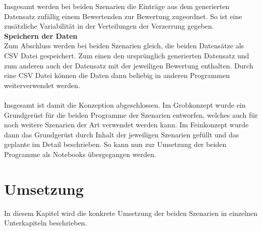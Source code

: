 \begin{onehalfspace}
Insgesamt werden bei beiden Szenarien die Einträge aus dem generierten Datensatz zufällig einem Bewertenden zur Bewertung zugeordnet. So ist eine zusätzliche Variabilität in der Verteilungen der Verzerrung gegeben.\\
\textbf{Speichern der Daten}\\
Zum Abschluss werden bei beiden Szenarien gleich, die beiden Datensätze als CSV Datei gespeichert. Zum einen den ursprünglich generierten Datensatz und zum anderen auch der Datensatz mit der jeweiligen Bewertung enthalten. Durch eine CSV Datei können die Daten dann beliebig in anderen Programmen weiterverwendet werden.\\ \\
Insgesamt ist damit die Konzeption abgeschlossen. Im Grobkonzept wurde ein Grundgerüst für die beiden Programme der Szenarien entworfen, welches auch für noch weitere Szenarien der Art verwendet werden kann. Im Feinkonzept wurde dann das Grundgerüst durch Inhalt der jeweiligen Szenarien gefüllt und das geplante im Detail beschrieben. So kann nun zur Umsetzung der beiden Programme als Notebooks übergegangen werden.

\section{Umsetzung}
\label{umsetzung}
In diesem Kapitel wird die konkrete Umsetzung der beiden Szenarien in einzelnen Unterkapiteln beschrieben.

\end{onehalfspace}
